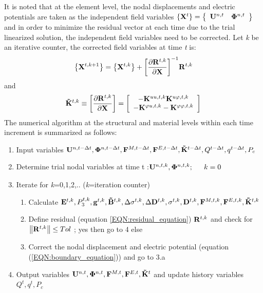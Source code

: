 It is noted that at the element level, the nodal displacements and electric potentials are taken as the independent field variables $\left\{ {{{\bf{X}}^t}} \right\} = \left\{ {\begin{array}{*{20}{c}} {{{\bf{U}}^{n,t}}}&{{{\bf{\Phi }}^{n,t}}} \end{array}} \right\}$ and in order to minimize the residual vector at each time due to the trial linearized solution, the independent field variables need to be corrected. 
Let \textit{k} be an iterative counter, the corrected field variables at time \textit{t} is:
\begin{equation}  
\left\{ {{{\bf{X}}^{t,k + 1}}} \right\} = \left\{ {{{\bf{X}}^{t,k}}} \right\} + {\left[ {\frac{{\partial {\bf{R}}_{}^{t,k}}}{{\partial {\bf{X}}}}} \right]^{ - 1}}{\bf{R}}_{}^{t,k}
\label{EQN:newton_raphson} 
\end{equation}
and
\begin{equation}  
{{\bf{\tilde K}}^{t,k}} \equiv \left[ {\frac{{\partial {\bf{R}}_{}^{t,k}}}{{\partial {\bf{X}}}}} \right] = \left[ {\begin{array}{*{20}{c}}
{ - {\bf{K}}_{}^{uu,t,k}{\rm{       }}{\bf{K}}_{}^{u\varphi ,t,k}}\\
{ - {\bf{K}}_{}^{\varphi u,t,k}{\rm{    }} - {\bf{K}}_{}^{\varphi \varphi ,t,k}}
\end{array}} \right]
\label{EQN:newton_raphson_then}
\end{equation}
The numerical algorithm at the structural and material levels within each time increment is summarized as follows:
\begin{enumerate}
  \item Input variables ${{\bf{U}}^{n,t - \Delta t}},{{\bf{\Phi }}^{n,t - \Delta t}},{{\bf{F}}^{M,t - \Delta t}},{{\bf{F}}^{E,t - \Delta t}},{{\bf{\tilde K}}^{t - \Delta t}},{Q^{t - \Delta t}},{q^{t - \Delta t}},{P_c}$
  \item Determine trial nodal variables at time t :${{\bf{U}}^{n,t,k}},{{\bf{\Phi }}^{n,t,k}};\begin{array}{*{20}{c}} {}&{k = 0} \end{array}$
  \item Iterate for \textit{k}=0,1,2,.. (\textit{k}=iteration counter)
  \begin{enumerate}
    \item Calculate ${\bf{E}}_{}^{t,k},P_3^{t,k},{{\bf{g}}^{t,k}},{{\bf{\tilde B}}^{t,k}},\Delta {{\bf{\sigma }}^{t,k}},\Delta {{\bf{D}}^{t,k}},{{\bf{\sigma }}^{t,k}},{{\bf{D}}^{t,k}},{{\bf{F}}^{M,t,k}},{{\bf{F}}^{E,t,k}},{{\bf{\tilde K}}^{t,k}}$
    \item Define residual (equation \ref{EQN:residual_equation}) ${{\bf{R}}^{t,k}}$ and check for $\left\| {{\bf{R}}_{}^{t,k}} \right\| \le Tol$ ; yes then go to 4 else  
    \item Correct the nodal displacement and electric potential (equation (\ref{EQN:boundary_equation}))  and go to 3.a
  \end{enumerate}
 \item Output variables ${{\bf{U}}^{n,t}},{{\bf{\Phi }}^{n,t}},
 {{\bf{F}}^{M,t}},{{\bf{F}}^{E,t}},{{\bf{\tilde K}}^t}$ and update history variables ${Q^t},{q^t},{P_c}$
\end{enumerate}  

